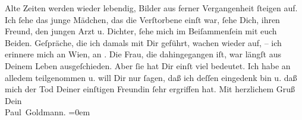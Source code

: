 \begin{ledgroupsized}[t]{13cm}
               Alte Zeiten werden wieder lebendig, Bilder aus ferner Vergangenheit ſteigen auf. Ich
               ſehe das junge Mädchen, das die Verſtorbene einſt war, ſehe Dich, ihren Freund, den jungen Arzt u. Dichter,
               ſehe mich im Beiſammenſein mit euch Beiden. Geſpräche, die ich damals mit Dir geführt, wachen
               wieder auf, – ich erinnere mich an Wien, an
                  \label{K_L03480-3v}\label{K_L03480-3h}.\pend
           \pstart
           Die Frau, die dahingegangen
               iſt, war längſt aus Deinem Leben ausgeſchieden. Aber ſie hat Dir einſt viel bedeutet.
                   Ich habe an alledem {\pb}teilgenommen u. will Dir nur ſagen, daß ich
               deſſen eingedenk bin u. daß mich der Tod Deiner einſtigen Freundin ſehr ergriffen hat.\pend
           \pstart
           Mit herzlichem Gruß {\\[\baselineskip]}Dein {\\[\baselineskip]}\spacefill\mbox{Paul Goldmann.}\pend
           \leftskip=0em{}
         
         \endnumbering{}\end{ledgroupsized}  \newcommand{\dateiname}{L03480}\newcommand{\titel}{Paul Goldmann an Arthur Schnitzler, 20. 11. 1925}\newcommand{\editorInnen}{Martin Anton Müller und Laura Untner}
      